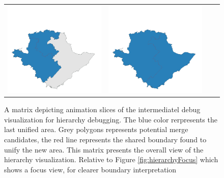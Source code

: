 \begin{figure}[p]
\begin{tabularx}{1\textwidth}{XXXX}
\includegraphics[width=1\linewidth]{images/ch6/mergeoverall/23}&
\includegraphics[width=1\linewidth]{images/ch6/mergeoverall/24} \\ %
\end{tabularx}
\caption{A matrix depicting animation slices of the intermediatel debug visualization for hierarchy debugging. The blue color rerpresents the last unified area. Grey polygons represents potential merge candidates, the red line represents the shared boundary found to unify the new area. This matrix presents the overall view of the hierarchy visualization. Relative to Figure \ref{fig:hierarchyFocus} which shows a focus view, for clearer boundary interpretation} \label{fig:hierarchyOverall}
\end{figure}

